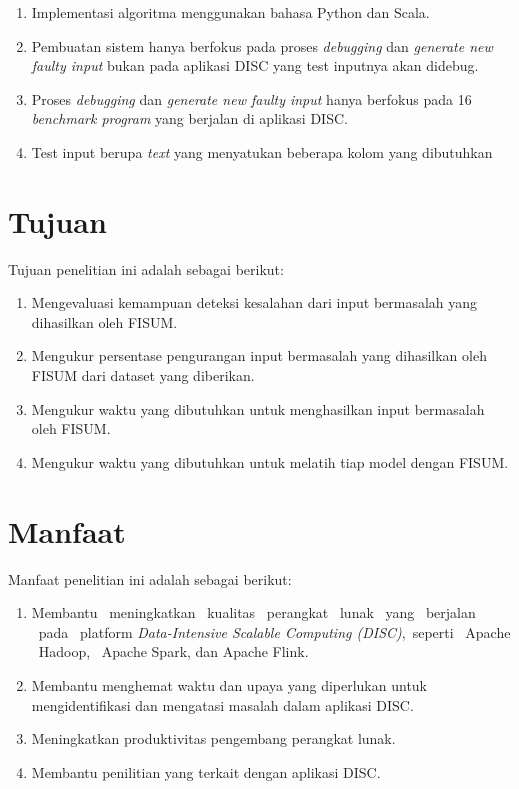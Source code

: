 \begin{enumerate}[nolistsep]

  \item Implementasi algoritma menggunakan bahasa Python dan Scala.

  \item Pembuatan sistem hanya berfokus pada proses \emph{debugging} dan \emph{generate new faulty input} bukan pada aplikasi DISC yang test inputnya akan didebug.

  \item Proses \emph{debugging} dan \emph{generate new faulty input} hanya berfokus pada 16 \emph{benchmark program} yang berjalan di aplikasi DISC. 

  \item Test input berupa \emph{text} yang menyatukan beberapa kolom yang dibutuhkan

\end{enumerate}

\section{Tujuan}
\label{sec:Tujuan}

Tujuan penelitian ini adalah sebagai berikut:

\begin{enumerate}[nolistsep]

  \item Mengevaluasi kemampuan deteksi kesalahan dari input bermasalah yang dihasilkan oleh FISUM.
  \item Mengukur persentase pengurangan input bermasalah yang dihasilkan oleh FISUM dari dataset yang diberikan.
  \item Mengukur waktu yang dibutuhkan untuk menghasilkan input bermasalah oleh FISUM.
  \item Mengukur waktu yang dibutuhkan untuk melatih tiap model dengan FISUM.

\end{enumerate}

\section{Manfaat}
\label{sec:Manfaat}

Manfaat penelitian ini adalah sebagai berikut:

\begin{enumerate}[nolistsep]
  \item Membantu \ meningkatkan \ kualitas \  perangkat \  lunak \ yang \  berjalan \ pada \ platform \emph{Data-Intensive Scalable Computing (DISC)},\  seperti \ Apache \ Hadoop, \ Apache Spark, dan Apache Flink.
  \item Membantu menghemat waktu dan upaya yang diperlukan untuk mengidentifikasi dan mengatasi masalah dalam aplikasi DISC.
  \item Meningkatkan produktivitas pengembang perangkat lunak.
  \item Membantu penilitian yang terkait dengan aplikasi DISC.

\end{enumerate}
